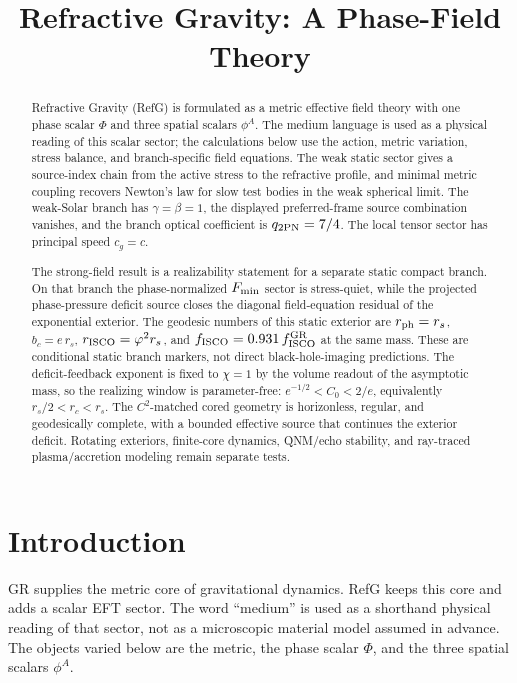 \documentclass[12pt,a4paper]{article}
\title{Refractive Gravity: A Phase-Field Theory}
\author{}
\date{}
\begin{document}
\maketitle

\begin{abstract}
Refractive Gravity (RefG) is formulated as a metric effective field theory with
one phase scalar $\Phi$ and three spatial scalars $\phi^A$. The medium language
is used as a physical reading of this scalar sector; the calculations below use
the action, metric variation, stress balance, and branch-specific field
equations. The weak static sector gives a source-index chain from the active
stress to the refractive profile, and minimal metric coupling recovers Newton's
law for slow test bodies in the weak spherical limit. The weak-Solar branch has
$\gamma=\beta=1$, the displayed preferred-frame source combination vanishes,
and the branch optical coefficient is $q_{2{\rm PN}}=7/4$. The local tensor
sector has principal speed $c_g=c$.

The strong-field result is a realizability statement for a separate static
compact branch. On that branch the phase-normalized $F_{\rm min}$ sector is
stress-quiet, while the projected phase-pressure deficit source closes the
diagonal field-equation residual of the exponential exterior. The geodesic
numbers of this static exterior are $r_{\rm ph}=r_s$, $b_c=e\,r_s$,
$r_{\rm ISCO}=\varphi^2r_s$, and
$f_{\rm ISCO}=0.931\,f_{\rm ISCO}^{\rm GR}$ at the same mass. These are
conditional static branch markers, not direct black-hole-imaging predictions.
The deficit-feedback exponent is fixed to $\chi=1$ by the volume readout of
the asymptotic mass, so the realizing window is parameter-free:
$e^{-1/2}<C_0<2/e$, equivalently $r_s/2<r_c<r_s$. The $C^2$-matched cored
geometry is horizonless, regular, and geodesically complete, with a bounded
effective source that continues the exterior deficit.
Rotating exteriors, finite-core dynamics, QNM/echo stability, and ray-traced
plasma/accretion modeling remain separate tests.
\end{abstract}

\section{Introduction}

GR supplies the metric core of gravitational dynamics. RefG keeps this core and
adds a scalar EFT sector. The word ``medium'' is used as a shorthand physical
reading of that sector, not as a microscopic material model assumed in advance.
The objects varied below are the metric, the phase scalar $\Phi$, and the three
spatial scalars $\phi^A$.
\end{document}
